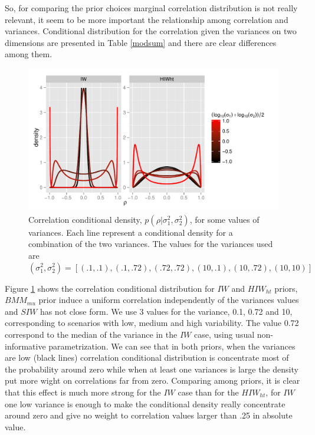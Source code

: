 \documentclass{article}
\begin{document}
So, for comparing the prior choices marginal correlation distribution is not really relevant, it seem to be more important the relationship among correlation and variances. Conditional distribution for the correlation given the variances on two dimensions are presented in Table \ref{modsum} and there are clear differences among them. 

\begin{figure}[htbp]
\begin{center}
 \includegraphics[width=\textwidth ]{conditional} 
 \vspace{-.5in}
\caption{Correlation conditional density, $p(\rho\vert \sigma_1^2, \sigma_2^2)$, for some values of variances. Each line represent a conditional density for a combination of the two variances. The values for the variances used are $(\sigma_1^2, \sigma_2^2) = [(.1,.1), (.1, .72), (.72,.72), (10, .1), (10, .72), (10, 10) ] $ \label{condo}}
\end{center}
\end{figure}

Figure \ref{condo} shows the correlation conditional distribution for $IW$ and $HIW_{ht}$ priors, $BMM_{mu}$ prior induce a uniform correlation independently of the variances values and $SIW$ has not close form. We use 3 values for the variance, 0.1, 0.72 and 10, corresponding to scenarios with low, medium and high variability. The value 0.72 correspond to the median of the variance in the $IW$ case, using usual non-informative parametrization.  We can see that in both priors, when the variances are low (black lines) correlation conditional distribution is concentrate most of the probability around zero while when at least one variances is large the density put more wight on correlations far from zero.  Comparing among priors, it is clear that this effect is much more strong for the $IW$ case than for the $HIW_{ht}$, for $IW$  one low variance is enough to make the conditional density really concentrate around zero and give no weight to correlation values  larger than .25 in absolute value. 
 
\end{document}
